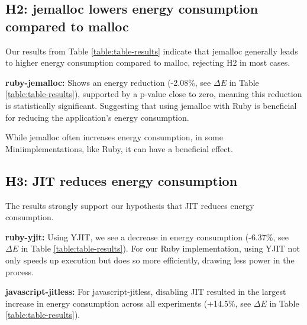 \documentclass[main.tex]{subfiles}
\begin{document}
\subsection{H2: jemalloc lowers energy consumption compared to malloc}

Our results from Table \ref{table:table-results} indicate that jemalloc generally leads to higher energy consumption compared to malloc, rejecting H2 in most cases.



\textbf{ruby-jemalloc:} Shows an energy reduction (-2.08\%, see $\Delta E$ in Table \ref{table:table-results}), supported by a p-value close to zero, meaning this reduction is statistically significant. Suggesting that using jemalloc with Ruby is beneficial for reducing the application's energy consumption. 
 
While jemalloc often increases energy consumption, in some Miniimplementations, like Ruby, it can have a beneficial effect.

\subsection{H3: JIT reduces energy consumption}

The results strongly support our hypothesis that JIT reduces energy consumption.

\textbf{ruby-yjit:} Using YJIT, we see a decrease in energy consumption (-6.37\%, see $\Delta E$ in Table \ref{table:table-results}). For our Ruby implementation, using YJIT not only speeds up execution but does so more efficiently, drawing less power in the process.

\textbf{javascript-jitless:} For javascript-jitless, disabling JIT resulted in the largest increase in energy consumption across all experiments (+14.5\%, see $\Delta E$ in Table \ref{table:table-results}).

\end{document}
